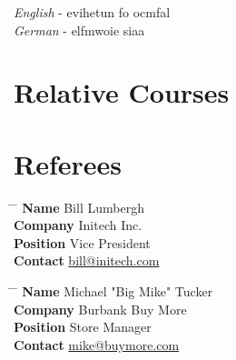 \documentclass[10pt]{article} %
\begin{document}

{
\textit{English} - evihetun fo  ocmfal\\
\textit{German} - elfmwoie  siaa \\
}


\section{Relative Courses}



\section{Referees}

\parbox{0.5\textwidth}{ %
\begin{tabbing}
\hspace{2.75cm} \= \hspace{4cm} \= \kill %
{\bf Name} \> Bill Lumbergh \\ %
{\bf Company} \> Initech Inc. \\ %
{\bf Position} \> Vice President \\ %
{\bf Contact} \> \href{mailto:bill@initech.com}{bill@initech.com} %
\end{tabbing}}
\hfill %
\parbox{0.5\textwidth}{ %
\begin{tabbing}
\hspace{2.75cm} \= \hspace{4cm} \= \kill %
{\bf Name} \> Michael "Big Mike" Tucker\\ %
{\bf Company} \> Burbank Buy More \\ %
{\bf Position} \> Store Manager \\ %
{\bf Contact} \> \href{mailto:mike@buymore.com}{mike@buymore.com} %
\end{tabbing}}

\end{document}
